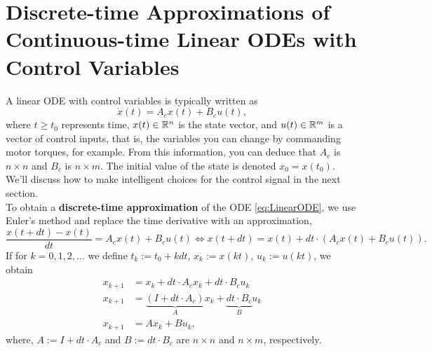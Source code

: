 \section{Discrete-time Approximations of Continuous-time Linear ODEs with Control Variables}

A linear ODE with control variables is typically written as
\begin{equation}
\label{eq:LinearODE}
    \dot{x}(t) = A_c x(t) + B_c u(t),
\end{equation}
where $t\ge t_0$ represents time, $x(t) \in \mathbb R^n$ is the state vector, and $u(t) \in \mathbb R^m$ is a vector of control inputs, that is, the variables you can change by commanding motor torques, for example. From this information, you can deduce that $A_c$ is $n \times n$ and $B_c$ is $n \times m$. The initial value of the state is denoted $x_0 = x(t_0)$. We'll discuss how to make intelligent choices for the control signal in the next section.\\

To obtain a \textbf{discrete-time approximation} of the ODE \eqref{eq:LinearODE}, we use Euler's method and replace the time derivative with an approximation, 
\begin{equation}
\label{eq:LinearDT01}
    \frac{x(t + dt) - x(t)}{dt} = A_c x(t) + B_c u(t) \iff x(t+dt) = x(t) + dt \cdot(A_cx(t) + B_c u(t)).
\end{equation}
If for $k= 0, 1, 2, ...$ we define $t_k := t_0 + k dt$, $x_k := x(kt)$, $u_k := u(kt)$, we obtain
\begin{equation}
\label{eq:LinearDT02}
\begin{aligned}
   x_{k+1} &= x_k + dt\cdot A_c x_k + dt\cdot B_c u_k \\
   x_{k+1} &= \underbrace{(I + dt \cdot A_c)}_{A} x_k + \underbrace{dt\cdot B_c}_{B} u_k \\
    x_{k+1} & = A x_k + B u_k,
\end{aligned}
\end{equation}
where, $A:= I + dt \cdot A_c$ and $B := dt\cdot B_c$ are $n\times n$ and $n \times m$, respectively.\\

